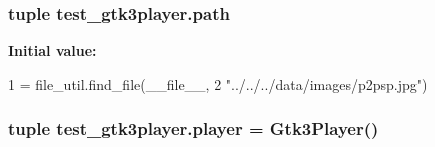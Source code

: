 \subsubsection[{path}]{\setlength{\rightskip}{0pt plus 5cm}tuple test\+\_\+gtk3player.\+path}\label{namespacetest__gtk3player_a417dbddeb3297fcadfb05a2bb3820eda}
{\bfseries Initial value\+:}
\begin{DoxyCode}
1 = file\_util.find\_file(\_\_file\_\_,
2                                     \textcolor{stringliteral}{"../../../data/images/p2psp.jpg"})
\end{DoxyCode}
\hypertarget{namespacetest__gtk3player_a835702f63626351e522ef6aec9f0a9e2}{}
\subsubsection[{player}]{\setlength{\rightskip}{0pt plus 5cm}tuple test\+\_\+gtk3player.\+player = {\bf Gtk3\+Player}()}\label{namespacetest__gtk3player_a835702f63626351e522ef6aec9f0a9e2}
